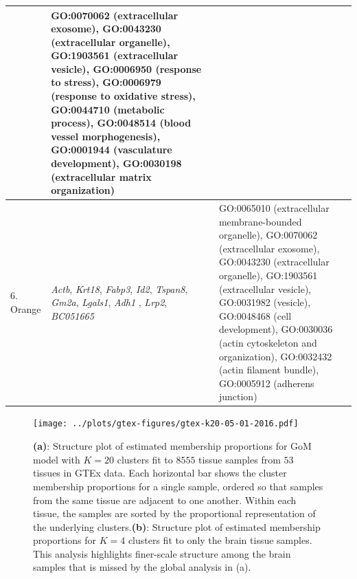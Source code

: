 \documentclass[10pt,letterpaper]{article}
\begin{document}
\begin{table}[!hp]
\begin{adjustwidth}{-2in}{0in}
\begin{tabular}{|p{1.0in}|p{1.5in}|p{4.3in}|}
& GO:0070062 (extracellular exosome), GO:0043230 (extracellular organelle), GO:1903561 (extracellular vesicle), GO:0006950 (response to stress), GO:0006979 (response to oxidative stress), GO:0044710 (metabolic process), GO:0048514 (blood vessel morphogenesis), GO:0001944 (vasculature development), GO:0030198 (extracellular matrix organization) \\
\hline
6. Orange & \textit{Actb}, \textit{Krt18}, \textit{Fabp3}, \textit{Id2}, \textit{Tspan8}, \textit{Gm2a}, \textit{Lgals1}, \textit{Adh1}
, \textit{Lrp2}, \textit{BC051665}
& GO:0065010 (extracellular membrane-bounded organelle), GO:0070062 (extracellular exosome),  GO:0043230 (extracellular organelle), GO:1903561 (extracellular vesicle), GO:0031982 (vesicle), GO:0048468 (cell development), GO:0030036 (actin cytoskeleton and organization), GO:0032432 (actin filament bundle),  GO:0005912 (adherens junction)\\
\hline
\end{tabular} \label{tab3}
\end{adjustwidth}
 \end{table}

 \clearpage

\begin{figure}[!h]
\texttt{[image: ../plots/gtex-figures/gtex-k20-05-01-2016.pdf]}
 \caption{ \textbf{(a)}: Structure plot of estimated membership proportions for GoM model with $K=20$ clusters fit to $8555$ tissue samples from $53$ tissues in GTEx data.  Each horizontal bar shows the cluster membership proportions for a single sample, ordered so that samples from the same tissue are adjacent to one another. Within each tissue, the samples are sorted by the proportional representation of the underlying clusters.\textbf{(b)}: Structure plot of estimated membership proportions for $K=4$ clusters fit to only the brain tissue samples. This analysis highlights finer-scale structure among the brain samples that is missed by the global analysis in (a).}
\label{fig1}
\end{figure}
\end{document}
